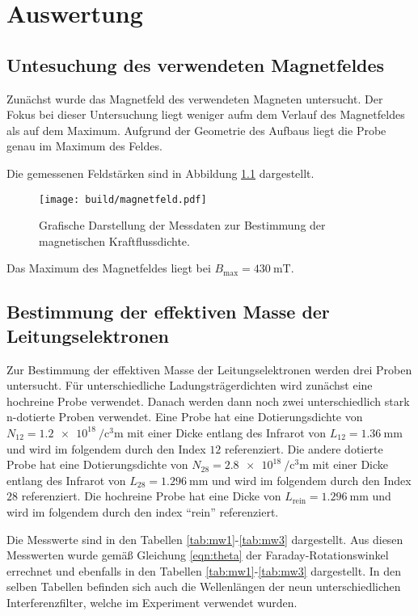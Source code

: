 \chapter{Auswertung}
\label{cha:Auswertung}
\section{Untesuchung des verwendeten Magnetfeldes}
\label{sec:magn}
Zunächst wurde das Magnetfeld des verwendeten Magneten untersucht. Der Fokus bei dieser Untersuchung liegt weniger aufm dem Verlauf des Magnetfeldes als auf dem Maximum. 
Aufgrund der Geometrie des Aufbaus liegt die Probe genau im Maximum des Feldes. 

Die gemessenen Feldstärken sind in Abbildung \ref{fig:magnetfeld} dargestellt. 

\begin{figure}
              \centering
              \texttt{[image: build/magnetfeld.pdf]}
              \caption{Grafische Darstellung der Messdaten zur Bestimmung der magnetischen Kraftflussdichte.}
              \label{fig:magnetfeld}
\end{figure}
Das Maximum des Magnetfeldes liegt bei $B_\mathrm{max} = \qty{430}{\milli\tesla}$.

\section{Bestimmung der effektiven Masse der Leitungselektronen}
\label{sec:effektive_masse}
Zur Bestimmung der effektiven Masse der Leitungselektronen werden drei  Proben untersucht. Für unterschiedliche Ladungsträgerdichten wird zunächst eine hochreine 
Probe verwendet. Danach werden dann noch zwei unterschiedlich stark n-dotierte Proben verwendet. Eine Probe hat eine Dotierungsdichte von $N_{12} = \qty{1.2e18}{\per\cubic\centi\metre}$
mit einer Dicke entlang des Infrarot von $L_{12} = \qty{1.36}{\milli\metre}$ und wird im folgendem durch den Index $12$ referenziert. Die andere dotierte Probe hat eine 
Dotierungsdichte von $N_{28} = \qty{2.8e18}{\per\cubic\centi\metre}$ mit einer Dicke entlang des Infrarot von $L_{28} = \qty{1.296}{\milli\metre}$ und wird im folgendem durch den Index 
$28$ referenziert. Die hochreine  Probe hat eine Dicke von $L_\mathrm{rein} = \qty{1.296}{\milli\metre}$ und wird im folgendem durch den index \enquote{rein} referenziert.

Die Messwerte sind in den Tabellen \ref{tab:mw1}-\ref{tab:mw3} dargestellt. Aus diesen Messwerten wurde gemäß Gleichung \eqref{eqn:theta} der Faraday-Rotationswinkel errechnet und ebenfalls 
in den Tabellen \ref{tab:mw1}-\ref{tab:mw3} dargestellt. In den selben Tabellen befinden sich auch die Wellenlängen der neun unterschiedlichen Interferenzfilter, 
welche im Experiment verwendet wurden. 

